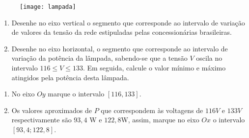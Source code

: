 \documentclass[10 pt,usenames,dvipsnames, oneside]{article}
\begin{document}
\begin{figure}[H]
\centering
\noindent\texttt{[image: lampada]}
\end{figure}

\begin{enumerate}
\item{}
Desenhe no eixo vertical o segmento que corresponde ao intervalo de variação de valores da tensão da rede estipuladas pelas concessionárias brasileiras.

\item{}
Desenhe no eixo horizontal, o segmento que corresponde ao intervalo de variação da potência da lâmpada, sabendo-se que a tensão $V$ oscila no intervalo $116\leq V \leq 133$. Em seguida, calcule o valor mínimo e máximo atingidos pela potência desta lâmpada.
\end{enumerate} 


\ifdefined\prof
\begin{solucao}

\begin{enumerate}
\item No eixo $Oy$ marque o intervalo $[116,133]$.
\item  Os valores aproximados de $P$ que correspondem às voltagens de $116V$ e $133V$ respectivamente são $93{,}4$ W e $122{,}8$W, assim, marque no eixo $Ox$  o intervalo $[93{,}4;122{,}8]$.
\end{enumerate}

\end{solucao}
\fi
\end{document}
